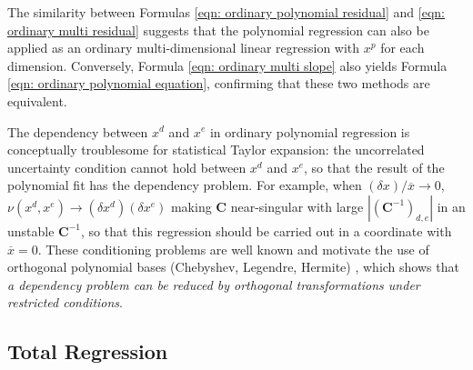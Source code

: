 \documentclass[twoside]{article}
\numberwithin{equation}{section}
\begin{document}
The similarity between Formulas \eqref{eqn: ordinary polynomial residual} and \eqref{eqn: ordinary multi residual} suggests that the polynomial regression can also be applied as an ordinary multi-dimensional linear regression with $x^p$ for each dimension.
Conversely, Formula \eqref{eqn: ordinary multi slope} also yields Formula \eqref{eqn: ordinary polynomial equation}, confirming that these two methods are equivalent.

The dependency between $x^d$ and $x^e$ in ordinary polynomial regression is conceptually troublesome for statistical Taylor expansion: the uncorrelated uncertainty condition cannot hold between $x^d$ and $x^e$, so that the result of the polynomial fit has the dependency problem.
For example, when $(\delta x)/\overline{x} \rightarrow 0$, $\nu(x^d, x^e) \rightarrow (\delta x^d) (\delta x^e)$ making $\mathbf{C}$ near-singular with large $|(\mathbf{C}^{-1})_{d,e}|$ in an unstable $\mathbf{C}^{-1}$, so that this regression should be carried out in a coordinate with $\overline{x} = 0$.
These conditioning problems are well known and motivate the use of orthogonal polynomial bases (Chebyshev, Legendre, Hermite) \cite{Polynomial_Regression}, which shows that \emph{a dependency problem can be reduced by orthogonal transformations under restricted conditions}.




\subsection{Total Regression}
\end{document}
